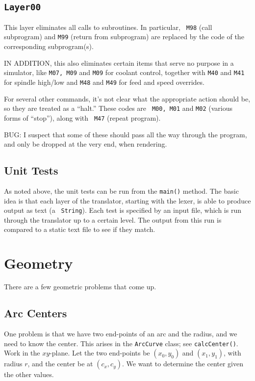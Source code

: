 \documentclass[titlepage,oneside,10pt]{article}
\begin{document}
\subsection{\tt Layer00}

This layer eliminates all calls to subroutines. In particular, {\tt
  M98} (call subprogram) and {\tt M99} (return from subprogram) are
replaced by the code of the corresponding subprogram(s).

IN ADDITION, this also eliminates certain items that serve no purpose
in a simulator, like {\tt M07, M09} and {\tt M09} for coolant
control, together with {\tt M40} and {\tt M41} for spindle high/low
and {\tt M48} and {\tt M49} for feed and speed overrides.

For several other commands, it's not clear what the appropriate action
should be, so they are treated as a ``halt.'' These codes are {\tt
  M00, M01} and {\tt M02} (various forms of ``stop''), along with {\tt
  M47} (repeat program).

BUG: I suspect that some of these should pass all the way through the
program, and only be dropped at the very end, when rendering.

\subsection{Unit Tests}

As noted above, the unit tests can be run from the {\tt main()}
method. The basic idea is that each layer of the translator, starting
with the lexer, is able to produce output as text (a {\tt
  String}). Each test is specified by an input file, which is run
through the translator up to a certain level. The output from this run
is compared to a static text file to see if they match.

\section{Geometry}

There are a few geometric problems that come up. 

\subsection{Arc Centers}

One problem is that we have two end-points of an arc and the radius,
and we need to know the center. This arises in the {\tt ArcCurve}
class; see {\tt calcCenter()}. Work in the $xy$-plane. Let the two
end-points be $(x_0,y_0)$ and $(x_1,y_1)$, with radius $r$, and the
center be at $(c_x,c_y)$. We want to determine the center given the
other values.
\end{document}

